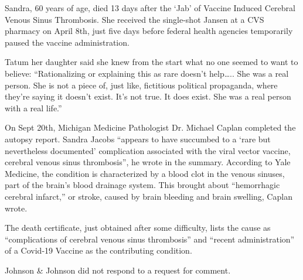 Sandra, 60 years of age, died 13 days after the ‘Jab’ of Vaccine Induced
Cerebral Venous Sinus Thrombosis. She received the single-shot Jansen at a CVS
pharmacy on April 8th, just five days before federal health agencies temporarily
paused the vaccine administration.

Tatum her daughter said she knew from the start what no one seemed to want to
believe: “Rationalizing or explaining this as rare doesn’t help….. She was a
real person. She is not a piece of, just like, fictitious political propaganda,
where they’re saying it doesn’t exist. It’s not true. It does exist. She was a
real person with a real life.”

On Sept 20th, Michigan Medicine Pathologist Dr. Michael Caplan completed the
autopsy report. Sandra Jacobs “appears to have succumbed to a ‘rare but
nevertheless documented’ complication associated with the viral vector vaccine,
cerebral venous sinus thrombosis”, he wrote in the summary. According to Yale
Medicine, the condition is characterized by a blood clot in the venous sinuses,
part of the brain’s blood drainage system. This brought about “hemorrhagic
cerebral infarct,” or stroke, caused by brain bleeding and brain swelling,
Caplan wrote.

The death certificate, just obtained after some difficulty, lists the cause as
“complications of cerebral venous sinus thrombosis” and “recent administration”
of a Covid-19 Vaccine as the contributing condition.

Johnson \& Johnson did not respond to a request for comment.


